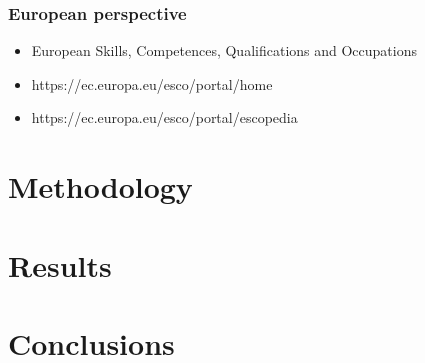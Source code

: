 \documentclass[printmode]{mgr}
\begin{document}
\subsection{European perspective}
\begin{itemize}
  \item European Skills, Competences, Qualifications and Occupations
  \item https://ec.europa.eu/esco/portal/home
  \item https://ec.europa.eu/esco/portal/escopedia
\end{itemize}



\chapter{Methodology}
\chapter{Results}
\chapter{Conclusions}



\listoffigures
\listoftables
\end{document}
